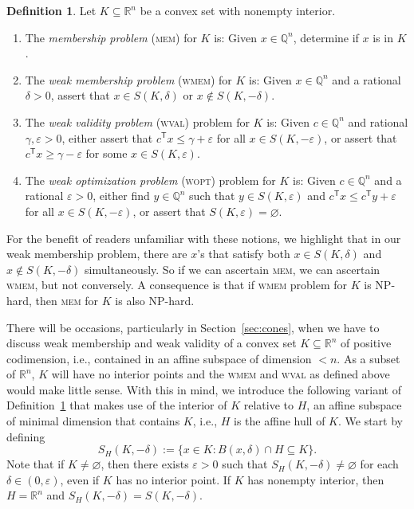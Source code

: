 \documentclass[11pt,reqno]{amsart}
\theoremstyle{definition}
\newtheorem{definition}[theorem]{Definition}
\theoremstyle{remark}
\begin{document}
\begin{definition}\label{def:mem}
Let $K \subseteq \mathbb{R}^n$ be a convex set with nonempty interior.
\begin{enumerate}[\upshape (i)]
\item The \emph{membership problem} (\textsc{mem}) for $K$ is: Given $x\in\mathbb{Q}^n$, determine if $x$ is in $K$.

\item The \emph{weak membership problem} (\textsc{wmem}) for $K$ is: Given $x\in\mathbb{Q}^n$ and a rational $\delta>0$,  assert that $x\in S(K,\delta)$ or $x\notin S(K,-\delta)$.  

\item The \emph{weak validity problem} (\textsc{wval}) problem for $K$ is: Given $c\in\mathbb{Q}^n$ and rational $\gamma,\varepsilon>0$,
either assert that $c^\mathsf{T} x\le \gamma +\varepsilon$ for all $x\in S(K,-\varepsilon)$, or assert that $c^\mathsf{T} x \ge \gamma -\varepsilon$ for some $x\in S(K,\varepsilon)$.

\item The \emph{weak optimization problem} (\textsc{wopt}) problem for $K$ is: Given $c\in\mathbb{Q}^n$ and a rational $\varepsilon>0$,
either find $y \in\mathbb{Q}^n$ such that  $y\in S(K,\varepsilon)$ and $c^\mathsf{T} x\le c^\mathsf{T} y +\varepsilon$ for all $x\in S(K,-\varepsilon)$, or assert that $S(K,\varepsilon) = \varnothing$.
\end{enumerate}
\end{definition}

For the benefit of readers unfamiliar with these notions, we highlight that in our weak membership problem, there are  $x$'s that satisfy both $x\in S(K,\delta)$ and $x\notin S(K,-\delta)$ simultaneously. So if we can ascertain \textsc{mem}, we can ascertain \textsc{wmem}, but not conversely. A consequence is that if \textsc{wmem} problem for $K$ is NP-hard, then \textsc{mem} for $K$ is also NP-hard.

There will be occasions, particularly in Section~\ref{sec:cones}, when we have to discuss weak membership and weak validity of a convex set $K \subseteq \mathbb{R}^n$ of  positive codimension, i.e., contained in an affine subspace of dimension $< n$. As a subset of $\mathbb{R}^n$, $K$ will have no interior points and the \textsc{wmem} and \textsc{wval} as defined above would make little sense. With this in mind, we introduce the following variant of Definition~\ref{def:mem} that makes use of the interior of $K$ relative to $H$, an affine subspace of minimal dimension that contains $K$, i.e., $H$ is the affine hull of $K$.  We start by defining
\[
S_H(K,-\delta):=\{x\in K: B(x,\delta)\cap H\subseteq K\}.
\]
Note that if $K \ne \varnothing$, then there exists $\varepsilon >0$ such that $S_H(K,-\delta) \ne \varnothing$ for each $\delta \in (0,\varepsilon)$, even if $K$ has no interior point. If $K$ has nonempty interior, then $H = \mathbb{R}^n$ and $S_H(K,-\delta) =S(K,-\delta)$.
\end{document}
